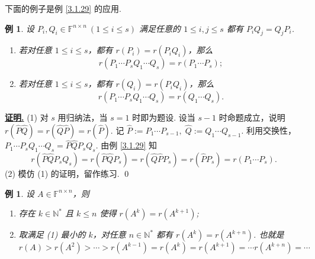 \documentclass[10pt,openany]{article}
\theoremstyle{thmstyle} %
\theoremstyle{defstyle} %
\theoremstyle{prostyle} %
\theoremstyle{exastyle}
\newtheorem{example}[theorem]{例}
\theoremstyle{remstyle}
\renewenvironment{proof}[1][证明]{\par\underline{\textbf{#1.}} \;\fangsong}{\qed\par}
\newcommand{\F}{\mathbb{F}}
\newcommand{\n}{^{n \times n}}
\begin{document}
下面的例子是例 \ref{3.1.29} 的应用.

\begin{example}
	设 \(  P_i,Q_i \in \F\n \ (1 \leq i \leq s) \) 满足任意的 \( 1 \leq i,j \leq s \) 都有 \( P_iQ_j=Q_jP_i \). 
	\begin{enumerate}[(1)]
		\item 若对任意 \( 1 \leq i \leq s \)，都有 \( r(P_i)=r(P_iQ_i) \)，那么
		\[ r(P_1\cdots P_s Q_1\cdots Q_s)=r(P_1\cdots P_s); \]
		\item 若对任意 \( 1 \leq i \leq s \)，都有 \( r(Q_i)=r(P_iQ_i) \)，那么
		\[ r(P_1\cdots P_s Q_1\cdots Q_s)=r(Q_1\cdots Q_s). \]
	\end{enumerate}
\end{example}

\begin{proof}
	(1) 对 \( s \) 用归纳法，当 \( s=1 \) 时即为题设. 设当 \( s-1 \) 时命题成立，说明 \( r(\hat{P} \hat{Q})=r(\hat{Q}\hat{P})=r(\hat{P}) \). 记 \( \hat{P}:=P_1\cdots P_{s-1}, \; \hat{Q}:=Q_1 \cdots Q_{s-1} \). 利用交换性，\( P_1\cdots P_s Q_1\cdots Q_s=\hat{P}\hat{Q}P_sQ_s \). 由例 \ref{3.1.29} 知 
	\[ r(\hat{P}\hat{Q}P_sQ_s)=r(\hat{P}\hat{Q}P_s)=r(\hat{Q}\hat{P}P_s)=r(\hat{P}P_s)=r(P_1\cdots P_s). \]
   (2) 模仿 (1) 的证明，留作练习.
\end{proof}

\begin{example} \label{3.1.31}
	设 \( A \in \F\n \)，则
	\begin{enumerate}[(1)]
		\item 存在 \( k \in \mathbb{N}^* \) 且 \( k \leq n \) 使得 \( r(A^k)=r(A^{k+1}) \);
		\item 取满足 (1) 最小的 \( k \)，对任意 \( n \in \mathbb{N}^* \) 都有 \( r(A^k)=r(A^{k+n}) \). 也就是
		\[ r(A)>r(A^2)>\cdots>r(A^{k-1})=r(A^k)=r(A^{k+1})=\cdots r(A^{k+n})=\cdots \]
	\end{enumerate}
\end{example}
\end{document}
